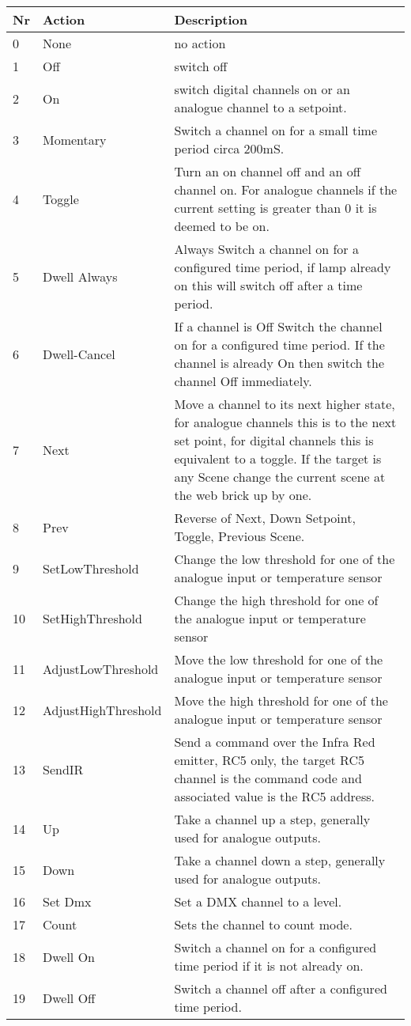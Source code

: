\begin{tabular}{l|l|p{12cm}}
Nr&Action&Description\\
\hline

0&None&no action\\
1&Off&switch off\\
2&On&switch digital channels on or an analogue channel to a setpoint.\\
3&Momentary&Switch a channel on for a small time period circa 200mS.\\
4&Toggle&Turn an on channel off and an off channel on. For analogue channels if the current setting is greater than 0 it is deemed to be on.\\
5&Dwell Always&Always Switch a channel on for a configured time period, if lamp already on this will switch off after a time period.\\
6&Dwell-Cancel&If a channel is Off Switch the channel on for a configured time period. 
If the channel is already On then switch the channel Off immediately.\\
7&Next&Move a channel to its next higher state, for analogue channels this is to the next set point, for digital channels this is equivalent to a toggle. If the target is any Scene change the current scene at the web brick up by one.\\
8&Prev&Reverse of Next, Down Setpoint, Toggle, Previous Scene.\\
9&SetLowThreshold&Change the low threshold for one of the analogue input or temperature sensor\\
10&SetHighThreshold&Change the high threshold for one of the analogue input or temperature sensor\\
11&AdjustLowThreshold&Move the low threshold for one of the analogue input or temperature sensor\\
12&AdjustHighThreshold&Move the high threshold for one of the analogue input or temperature sensor\\
13&SendIR&Send a command over the Infra Red emitter, RC5 only, the target RC5 channel is the command code 
and associated value is the RC5 address.\\
14&Up&Take a channel up a step, generally used for analogue outputs.\\
15&Down&Take a channel down a step, generally used for analogue outputs.\\
16&Set Dmx&Set a DMX channel to a level.\\
17&Count&Sets the channel to count mode.\\
18&Dwell On&Switch a channel on for a configured time period if it is not already on.\\
19&Dwell Off&Switch a channel off after a configured time period.\\
\end{tabular}

